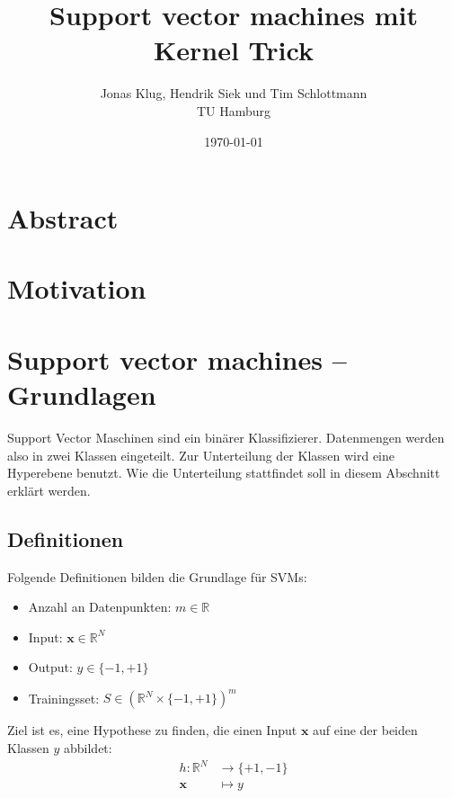 \documentclass[10pt,a4paper]{scrartcl}
\title{Support vector machines mit Kernel Trick}
\author{Jonas Klug, Hendrik Siek und Tim Schlottmann \\ TU Hamburg }
\date{\today}
\begin{document}
    \maketitle

    \begin{multicols}{2}

        \section{Abstract}

        \section{Motivation}

        \section{Support vector machines -- Grundlagen}
        Support Vector Maschinen sind ein binärer Klassifizierer. Datenmengen werden also in zwei Klassen eingeteilt. Zur Unterteilung der Klassen wird eine Hyperebene benutzt. Wie die Unterteilung stattfindet soll in diesem Abschnitt erklärt werden.

            \subsection{Definitionen}
                Folgende Definitionen bilden die Grundlage für SVMs:

                \begin{itemize}
                    \item Anzahl an Datenpunkten: $ m \in \mathbb{R} $
                    \item Input: $ \boldsymbol{x} \in \mathbb{R}^N $
                    \item Output: $ y \in \{ -1, +1 \} $
                    \item Trainingsset: $S \in (\mathbb{R}^N \times \{ -1, +1 \})^m $
                \end{itemize}

                Ziel ist es, eine Hypothese zu finden, die einen Input $\boldsymbol{x}$ auf eine der beiden Klassen $y$ abbildet: \begin{align*}
                    h: \mathbb{R}^N &\to \{ +1, -1 \} \\
                    \boldsymbol{x} &\mapsto y
                \end{align*}

\end{multicols}
\end{document}
